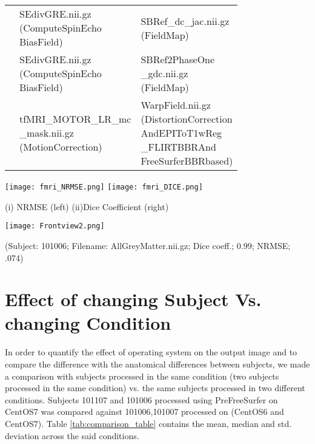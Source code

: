 \begin{center}
\begin{longtable}{|p{}|p{}|p{}|}
& \makecell[l]{SEdivGRE.nii.gz\\(ComputeSpinEcho\\BiasField)}                         & \makecell[l]{SBRef\_dc\_jac.nii.gz\\(FieldMap)} \\\cline{2-3}
& \makecell[l]{SEdivGRE.nii.gz\\(ComputeSpinEcho\\BiasField)}                         & \makecell[l]{SBRef2PhaseOne\\\_gdc.nii.gz\\(FieldMap)} \\\cline{2-3}
& \makecell[l]{tfMRI\_MOTOR\_LR\_mc\\\_mask.nii.gz\\(MotionCorrection)}               & \makecell[l]{WarpField.nii.gz\\(DistortionCorrection\\AndEPIToT1wReg\\\_FLIRTBBRAnd\\FreeSurferBBRbased)} \\\cline{1-3}
\end{longtable}
\label{tab:fMRIVolume_comparison_table}
\end{center}
\hfill \break

\begin{center}
\texttt{[image: fmri\_NRMSE.png]}%
\texttt{[image: fmri\_DICE.png]}
\caption*{(i) NRMSE (left) (ii)Dice Coefficient (right)}
\label{fig:fMRI_metric_values}
\end{center}

\hfill \break
\begin{center}
\texttt{[image: Frontview2.png]}%
\caption*{(Subject: 101006; Filename: AllGreyMatter.nii.gz; Dice coeff.; 0.99; NRMSE; .074)}
\label{fig:allgrey_matter} 
\end{center}

\section{Effect of changing Subject Vs. changing Condition}\label{sec:comparison}
In order to quantify the effect of operating system on the output image and to compare the difference with the anatomical differences between subjects, we made a comparison with subjects processed in the same condition (two subjects processed in the same condition) vs. the same subjects processed in two different conditions. Subjects 101107 and 101006 processed using PreFreeSurfer on CentOS7 was compared against 101006,101007 processed on (CentOS6 and CentOS7). Table \ref{tab:comparison_table} contains the mean, median and std. deviation across the said conditions.

